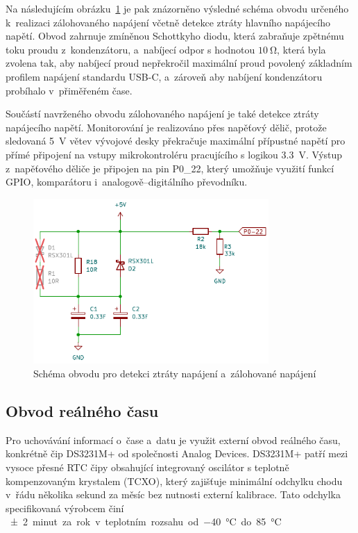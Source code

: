 Na následujícím obrázku~\ref{fig:backup-power} je pak znázorněno výsledné schéma obvodu určeného k~realizaci zálohovaného napájení včetně detekce ztráty hlavního napájecího napětí. Obvod zahrnuje zmíněnou Schottkyho diodu, která zabraňuje zpětnému toku proudu z~kondenzátoru, a~nabíjecí odpor s hodnotou $\SI{10}{\ohm}$, která byla zvolena tak, aby nabíjecí proud nepřekročil maximální proud povolený základním profilem napájení standardu USB-C, a~zároveň aby nabíjení kondenzátoru probíhalo v~přiměřeném čase.

\newpage

Součástí navrženého obvodu zálohovaného napájení je také detekce ztráty napájecího napětí. Monitorování je realizováno přes napěťový dělič, protože sledovaná \SI{5}{\volt} větev vývojové desky překračuje maximální přípustné napětí pro přímé připojení na vstupy mikrokontroléru pracujícího s logikou \SI{3.3}{\volt}. Výstup z~napěťového děliče je připojen na pin P0\_22, který umožňuje využití funkcí GPIO, komparátoru i~analogově--digitálního převodníku.

\begin{figure}[h]
    \centering
    \includegraphics[width=0.80\textwidth]{obrazky-figures/backup-power.pdf}
    
    \caption{Schéma obvodu pro detekci ztráty napájení a~zálohované napájení}
    \label{fig:backup-power}
\end{figure}

\newpage

\subsection{Obvod reálného času}
Pro uchovávání informací o~čase a~datu je využit externí obvod reálného času, konkrétně čip DS3231M+ od společnosti Analog Devices. DS3231M+ patří mezi vysoce přesné RTC čipy obsahující integrovaný oscilátor s teplotně kompenzovaným krystalem (TCXO), který zajišťuje minimální odchylku chodu v~řádu několika sekund za měsíc bez nutnosti externí kalibrace. Tato odchylka specifikovaná výrobcem činí \SI{\pm2} minut za rok v~teplotním rozsahu od \SI{-40}{\degreeCelsius} do \SI{+85}{\degreeCelsius}.~\cite{DS3231_manual}


